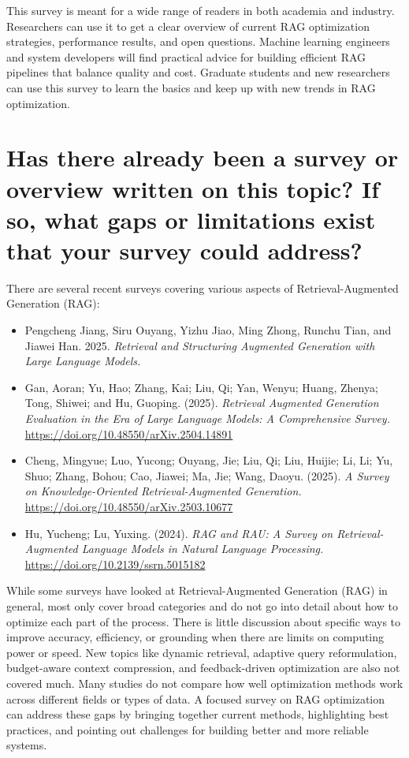 \documentclass[11pt]{article}
\begin{document}
This survey is meant for a wide range of readers in both academia and industry. Researchers can use it to get a clear overview of current RAG optimization strategies, performance results, and open questions. Machine learning engineers and system developers will find practical advice for building efficient RAG pipelines that balance quality and cost. Graduate students and new researchers can use this survey to learn the basics and keep up with new trends in RAG optimization.

\section{Has there already been a survey or overview written on this topic? If so, what gaps or limitations exist that your survey could address?}
There are several recent surveys covering various aspects of Retrieval-Augmented Generation (RAG):

\begin{itemize}
    \item Pengcheng Jiang, Siru Ouyang, Yizhu Jiao, Ming Zhong, Runchu Tian, and Jiawei Han. 2025. \textit{Retrieval and Structuring Augmented Generation with Large Language Models.}
    \item Gan, Aoran; Yu, Hao; Zhang, Kai; Liu, Qi; Yan, Wenyu; Huang, Zhenya; Tong, Shiwei; and Hu, Guoping. (2025). \textit{Retrieval Augmented Generation Evaluation in the Era of Large Language Models: A Comprehensive Survey.} \url{https://doi.org/10.48550/arXiv.2504.14891}
    \item Cheng, Mingyue; Luo, Yucong; Ouyang, Jie; Liu, Qi; Liu, Huijie; Li, Li; Yu, Shuo; Zhang, Bohou; Cao, Jiawei; Ma, Jie; Wang, Daoyu. (2025). \textit{A Survey on Knowledge-Oriented Retrieval-Augmented Generation.} \url{https://doi.org/10.48550/arXiv.2503.10677}
    \item Hu, Yucheng; Lu, Yuxing. (2024). \textit{RAG and RAU: A Survey on Retrieval-Augmented Language Models in Natural Language Processing.} \url{https://doi.org/10.2139/ssrn.5015182}
\end{itemize}

While some surveys have looked at Retrieval-Augmented Generation (RAG) in general, most only cover broad categories and do not go into detail about how to optimize each part of the process. There is little discussion about specific ways to improve accuracy, efficiency, or grounding when there are limits on computing power or speed. New topics like dynamic retrieval, adaptive query reformulation, budget-aware context compression, and feedback-driven optimization are also not covered much. Many studies do not compare how well optimization methods work across different fields or types of data. A focused survey on RAG optimization can address these gaps by bringing together current methods, highlighting best practices, and pointing out challenges for building better and more reliable systems.
\end{document}
